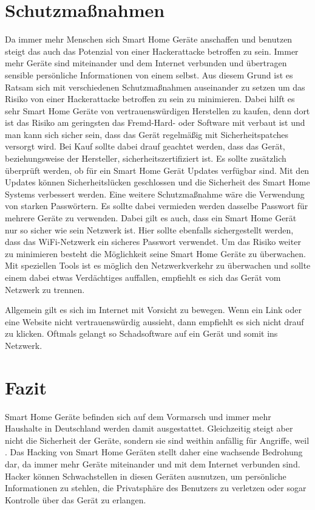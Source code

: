 \documentclass[12pt, a4paper, onecolumn, oneside, toc=bibliographynumbered, liststotoc]{scrreprt} %
\begin{document}
    \chapter{Schutzmaßnahmen}
    Da immer mehr Menschen sich Smart Home Geräte anschaffen und benutzen steigt das auch das Potenzial von einer Hackerattacke betroffen zu sein. Immer mehr Geräte sind miteinander und dem Internet verbunden und übertragen sensible persönliche Informationen von einem selbst. Aus diesem Grund ist es Ratsam sich mit verschiedenen Schutzmaßnahmen auseinander zu setzen um das Risiko von einer Hackerattacke betroffen zu sein zu minimieren. Dabei hilft es sehr Smart Home Geräte von vertrauenswürdigen Herstellen zu kaufen, denn dort ist das Risiko am geringsten das Fremd-Hard- oder Software mit verbaut ist und man kann sich sicher sein, dass das Gerät regelmäßig mit Sicherheitspatches versorgt wird. Bei Kauf sollte dabei drauf geachtet werden, dass das Gerät, beziehungsweise der Hersteller, sicherheitszertifiziert ist. Es sollte zusätzlich überprüft werden, ob für ein Smart Home Gerät Updates verfügbar sind. Mit den Updates können Sicherheitslücken geschlossen und die Sicherheit des Smart Home Systems verbessert werden. Eine weitere Schutzmaßnahme wäre die Verwendung von starken Passwörtern. Es sollte dabei vermieden werden dasselbe Passwort für mehrere Geräte zu verwenden. Dabei gilt es auch, dass ein Smart Home Gerät nur so sicher wie sein Netzwerk ist. Hier sollte ebenfalls sichergestellt werden, dass das WiFi-Netzwerk ein sicheres Passwort verwendet. Um das Risiko weiter zu minimieren besteht die Möglichkeit seine Smart Home Geräte zu überwachen. Mit speziellen Tools ist es möglich den Netzwerkverkehr zu überwachen und sollte einem dabei etwas Verdächtiges auffallen, empfiehlt es sich das Gerät vom Netzwerk zu trennen.

   Allgemein gilt es sich im Internet mit Vorsicht zu bewegen. Wenn ein Link oder eine Website nicht vertrauenswürdig aussieht, dann empfiehlt es sich nicht drauf zu klicken. Oftmals gelangt so Schadsoftware auf ein Gerät und somit ins Netzwerk. 
        
	\chapter{Fazit}
 Smart Home Geräte befinden sich auf dem Vormarsch und immer mehr Haushalte in Deutschland werden damit ausgestattet. Gleichzeitig steigt aber nicht die Sicherheit der Geräte, sondern sie sind weithin anfällig für Angriffe, weil . Das Hacking von Smart Home Geräten stellt daher eine wachsende Bedrohung dar, da immer mehr Geräte miteinander und mit dem Internet verbunden sind. Hacker können Schwachstellen in diesen Geräten ausnutzen, um persönliche Informationen zu stehlen, die Privatsphäre des Benutzers zu verletzen oder sogar Kontrolle über das Gerät zu erlangen.
 
\end{document}

